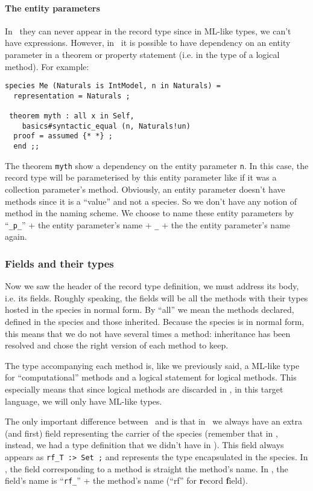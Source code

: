 \paragraph{The entity parameters} In \ocaml\ they can never appear in
the record type since in ML-like types, we can't have expressions. 
However, in \coq\ it is possible to have dependency on an entity
parameter in a theorem or property statement (i.e. in the type of a
logical method). For example:
{\scriptsize
\begin{lstlisting}
species Me (Naturals is IntModel, n in Naturals) =
  representation = Naturals ;

 theorem myth : all x in Self,
    basics#syntactic_equal (n, Naturals!un)
  proof = assumed {* *} ;
  end ;;
\end{lstlisting}
}
The theorem {\tt myth} show a dependency on the entity parameter
{\tt n}. In this case, the record type will be parameterised by this
entity parameter like if it was a collection parameter's
method. Obviously, an entity parameter doesn't have methods since it
is a ``value'' and not a species. So we don't have any notion of
method in the naming scheme. We choose to name these entity parameters
by ``{\tt \_p\_}'' + the entity parameter's name  + {\tt \_} + the
the entity parameter's name again.

\subsubsection{Fields and their types}
Now we saw the header of the record type definition, we must address
its body, i.e. its fields. Roughly speaking, the fields will be all
the methods with their types hosted in the species in normal form. By
``all'' we mean the methods declared, defined in the species and those
inherited. Because the species is in normal form, this means that we
do not have several times a method: inheritance has been resolved and
chose the right version of each method to keep.

The type accompanying each method is, like we previously said, a
ML-like type for ``computational'' methods and a logical statement for
logical methods. This especially means that since logical methods are
discarded in \ocaml, in this target language, we will only have
ML-like types.

The only important difference between \ocaml\ and \coq is that in
\coq\ we always have an extra (and first) field representing the
carrier of the species (remember that in \ocaml, instead, we had a
type definition that we didn't have in \coq). This field always
appears as {\tt  rf\_T :> Set ;} and represents the type encapsulated
in the species. In \ocaml, the field corresponding to a method is
straight the method's name. In \coq, the field's name is
``{\tt rf\_}'' + the method's name (``rf'' for {\bf r}ecord
{\bf f}ield).

